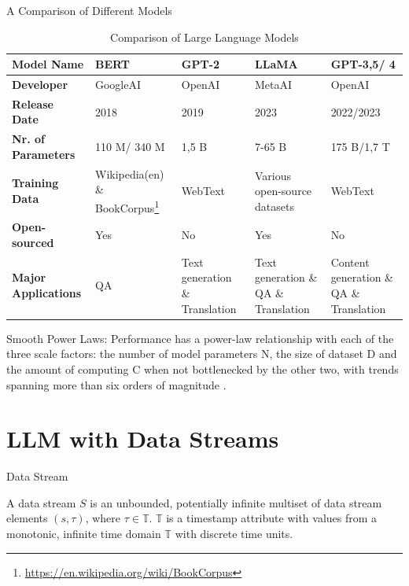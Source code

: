 \documentclass[t]{beamer}
\begin{document}
\begin{frame}{A Comparison of Different Models}
  \begin{table}[H]
    \centering
    \small
    \begin{tabular}{| p{4cm} | p{2cm} | p{2cm} | p{2cm} | p{2cm} |}
    \hline
    \textbf{Model Name} & BERT & GPT-2 & LLaMA & GPT-3,5/ 4 \\
    \hline
    \textbf{Developer} & GoogleAI & OpenAI & MetaAI & OpenAI \\
    \hline
    \textbf{Release Date} & 2018 & 2019 & 2023 & 2022/2023 \\
    \hline
    \textbf{Nr. of Parameters} & 110 M/ 340 M & 1,5 B & 7-65 B & 175 B/1,7 T \\
    \hline
    \textbf{Training Data} & Wikipedia(en) \& BookCorpus\footnote{\url{https://en.wikipedia.org/wiki/BookCorpus}} & WebText & Various open-source datasets & WebText \\
    \hline
    \textbf{Open-sourced} & Yes & No & Yes & No \\
    \hline
    \textbf{Major Applications} & QA & Text generation \& Translation & Text generation \& QA \& Translation & Content generation \& QA \& Translation \\
    \hline
    \end{tabular}
    \caption{Comparison of Large Language Models}
    \label{table:comparison}
  \end{table}
  \begin{definition}{Smooth Power Laws:}
    Performance has a power-law relationship with each of the three scale factors: the number of model
    parameters N, the size of dataset D and the amount of computing C when not bottlenecked by the other two,
     with trends spanning more than six orders of magnitude \cite{Kaplan20}.
  \end{definition}
\end{frame}

\section{LLM with Data Streams}
\begin{frame}{Data Stream}
  \vspace{1cm}
  \begin{definition}
    A data stream $S$ is an unbounded, potentially infinite multiset of data stream elements $(s,\tau)$, where $\tau \in \mathbb{T}$.
     $\mathbb{T}$ is a timestamp attribute with values from a monotonic, infinite time domain $\mathbb{T}$ with discrete time units. \cite{Geisler13}
  \end{definition}
\end{frame}
\end{document}
